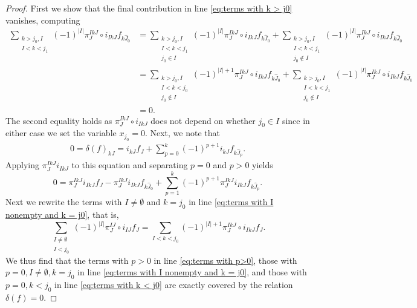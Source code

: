\documentclass[11pt,psamsfonts, oneside, reqno]{amsart}
\theoremstyle{definition}
\theoremstyle{remark}
\numberwithin{equation}{section}
\begin{document}
\begin{proof}
	First we show that the final contribution in line \eqref{eq:terms with k > j0} vanishes, computing
	\begin{align*}
		\sum_{\substack{k > j_0, I\\I < k < j_1}} (-1)^{|I|} \pi_{J}^{IkJ} \circ i_{IkJ} f_{k\hat{J}_0} &= \sum_{\substack{k > j_0, I\\I < k < j_1 \\ 
				j_0 \in I}} (-1)^{|I|} \pi_{J}^{IkJ} \circ i_{IkJ} f_{k\hat{J}_0} + \sum_{\substack{k > j_0, I\\I < k < j_1 \\ j_0 \notin I}} (-1)^{|I|} \pi_{J}^{IkJ} \circ i_{IkJ}f_{k\hat{J}_0}\\
		&= \sum_{\substack{k > j_0, I\\I < k < j_0\\ j_0 \notin I}} (-1)^{|I| + 1} \pi_{J}^{IkJ} \circ i_{IkJ} f_{k\hat{J}_0} + \sum_{\substack{k > j_0, I\\I < k< j_1\\ j_0 \notin I}} (-1)^{|I|} \pi_{J}^{IkJ} \circ i_{IkJ}f_{k\hat{J}_0}\\& = 0.
	\end{align*}
	The second equality holds as $\pi_{J}^{IkJ} \circ i_{IkJ}$ does not depend on whether $j_0 \in I$ since in either case we set the variable $x_{j_0} = 0$. Next, we note that 
	\begin{align*}
		0 = \delta(f)_{kJ} = i_{kJ} f_J + \sum_{p = 0}^k (-1)^{p+1} i_{kJ} f_{k\hat{J}_p}.
	\end{align*}
	Applying $\pi_{J}^{IkJ} i_{IkJ}$ to this equation and separating $p = 0$ and $p > 0$ yields
	\begin{equation*}
		0 = \pi_{J}^{IkJ} i_{IkJ} f_J - \pi_{J}^{IkJ} i_{IkJ} f_{k\hat{J}_0} + \sum_{p=1}^{k} (-1)^{p+1} \pi_{J}^{IkJ} i_{IkJ} f_{k\hat{J}_p}.
	\end{equation*}
	Next we rewrite the terms with $I \neq \emptyset$ and $k = j_0$ in line \eqref{eq:terms with I nonempty and k = j0}, that is,
	\begin{equation*}
		\sum_{\substack{I\neq \emptyset\\I < j_0}} (-1)^{|I|} \pi_{J}^{IJ} \circ i_{IJ} f_{J} = \sum_{I < k < j_0} (-1)^{|I|+1} \pi_{J}^{IkJ} \circ i_{IkJ} f_{J}.
	\end{equation*}
	We thus find that the terms with $p > 0$ in line \eqref{eq:terms with p>0}, those with $p = 0, I \neq \emptyset, k = j_0$ in line \eqref{eq:terms with I nonempty and k = j0}, and those with $p =0, k < j_0$ in line \eqref{eq:terms with k < j0} are exactly covered by the relation $\delta(f) = 0$.
\end{proof}
\end{document}
